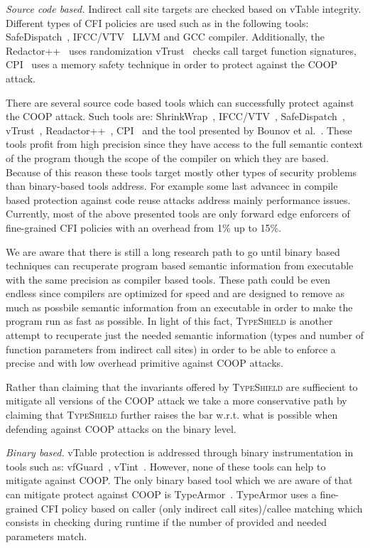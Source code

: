 \textit{Source code based.} Indirect call site targets are checked based on vTable integrity.
Different types of CFI policies are used such as in the following tools:
SafeDispatch~\cite{safedispatch:jang}, IFCC/VTV~\cite{vtv:tice} LLVM and GCC compiler.
Additionally, the Redactor++~\cite{crane:readactor++} uses randomization 
vTrust~\cite{zhang:vtrust} checks call target function signatures, 
CPI~\cite{volodymyr:cpi} uses a memory safety technique
in order to protect against the COOP attack.

There are several source code based tools 
which can successfully protect against the COOP attack.
Such tools are: ShrinkWrap~\cite{haller:shrinkwrap}, IFCC/VTV~\cite{vtv:tice}, 
SafeDispatch~\cite{safedispatch:jang}, vTrust~\cite{zhang:vtrust}, Readactor++~\cite{crane:readactor++}, CPI~\cite{volodymyr:cpi} and the
tool presented by Bounov et al.~\cite{bounov:interleaving}. These tools profit from high precision
since they have access to the full semantic context of the program though the scope
of the compiler on which they are based. 
Because of this reason these tools target mostly other types of security problems than binary-based 
tools address. For example some last advancec in compile based protection against 
code reuse attacks address mainly performance issues.
Currently, most of the above presented tools are only forward
edge enforcers of fine-grained CFI policies with an overhead from 1\% up to 15\%.

We are aware that there is still a long research path to go until binary based techniques can 
recuperate program based semantic information from executable with the same precision as compiler based tools.
These path could be even endless since compilers are optimized for speed and are designed to remove as much as possbile semantic information
from an executable in order to make the program run as fast as possible. In light of this fact,
\textsc{TypeShield} is another attempt to recuperate just the needed semantic information (types and number of function parameters from
indirect call sites) in order to be able to enforce a precise and with low overhead primitive against COOP attacks.

Rather than claiming that the invariants offered by \textsc{TypeShield} are suffiecient
to mitigate all versions of the COOP attack we take a more conservative path by claiming that \textsc{TypeShield} 
further raises the bar w.r.t. what is possible when defending against COOP attacks on the binary level.

\textit{Binary based.} vTable protection is addressed through binary instrumentation in tools
such as: vfGuard~\cite{vfuard:aravind}, vTint~\cite{vtint:zhang}. However, none of these tools can
help to mitigate against COOP. The only binary based tool which we are aware of that
can mitigate protect against COOP is TypeArmor~\cite{veen:typearmor}.  
TypeArmor uses a fine-grained CFI policy based on caller (only indirect call sites)/callee matching 
which consists in checking during runtime if the number of provided and needed parameters match.


